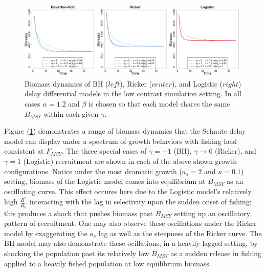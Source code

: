%
\begin{figure}[h!]
\includegraphics[width=\textwidth]{../ddBias/growthTriptic.png}
\caption{
Biomass dynamics of BH ($left$), Ricker ($center$), and Logistic ($right$) 
delay differential models in the low contrast simulation setting. In all cases 
$\alpha=1.2$ and $\beta$ is chosen so that each model shares the same 
$B_{MSY}$ within each given $\gamma$.
}\label{delayTriptic}
\end{figure}
%
Figure (\ref{delayTriptic}) demonstrates a range of biomass dynamics that the Schnute 
delay model can display under a spectrum of growth behaviors with fishing held consistent 
at $F_{MSY}$. The three special cases of $\gamma=-1$ (BH), $\gamma\to0$ 
(Ricker), and $\gamma=1$ (Logistic) recruitment are shown in each of the above 
shown growth configurations.
Notice under the most dramatic growth ($a_s=2$ and $\kappa=0.1$) setting, biomass 
of the Logistic model comes into equilibrium at $B_{MSY}$ as an oscillating 
curve. This effect occures here due to the Logistic model's relatively high $\frac{B^*}{B_0}$
interacting with the lag in selectivity upon the sudden onset of fishing; this 
produces a shock that pushes biomass past $B_{MSY}$ setting up an oscillatory
pattern of recruitment.  
One may also observe these oscillations under the Ricker model by exaggerating 
the $a_s$ lag as well as the steepness of the Ricker curve. The BH model may 
also demonstrate these ocillations, in a heavily lagged setting, by shocking 
the population past its relatively low $B_{MSY}$ as a sudden release in fishing applied to a 
heavily fished population at low equilibrium biomass. 


